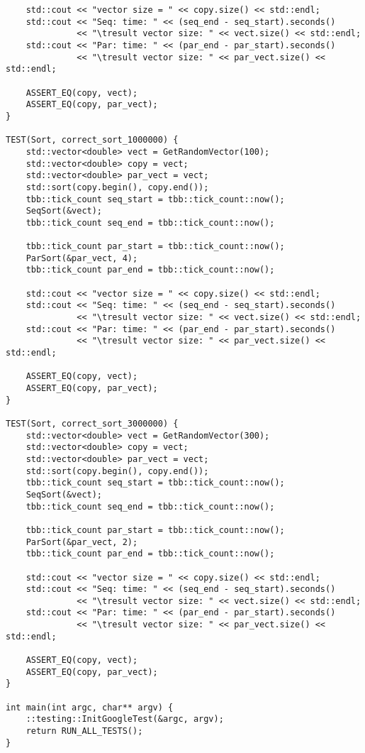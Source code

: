 \documentclass{report}
\begin{document}
\begin{lstlisting}
    std::cout << "vector size = " << copy.size() << std::endl;
    std::cout << "Seq: time: " << (seq_end - seq_start).seconds()
              << "\tresult vector size: " << vect.size() << std::endl;
    std::cout << "Par: time: " << (par_end - par_start).seconds()
              << "\tresult vector size: " << par_vect.size() << std::endl;

    ASSERT_EQ(copy, vect);
    ASSERT_EQ(copy, par_vect);
}

TEST(Sort, correct_sort_1000000) {
    std::vector<double> vect = GetRandomVector(100);
    std::vector<double> copy = vect;
    std::vector<double> par_vect = vect;
    std::sort(copy.begin(), copy.end());
    tbb::tick_count seq_start = tbb::tick_count::now();
    SeqSort(&vect);
    tbb::tick_count seq_end = tbb::tick_count::now();

    tbb::tick_count par_start = tbb::tick_count::now();
    ParSort(&par_vect, 4);
    tbb::tick_count par_end = tbb::tick_count::now();

    std::cout << "vector size = " << copy.size() << std::endl;
    std::cout << "Seq: time: " << (seq_end - seq_start).seconds()
              << "\tresult vector size: " << vect.size() << std::endl;
    std::cout << "Par: time: " << (par_end - par_start).seconds()
              << "\tresult vector size: " << par_vect.size() << std::endl;

    ASSERT_EQ(copy, vect);
    ASSERT_EQ(copy, par_vect);
}

TEST(Sort, correct_sort_3000000) {
    std::vector<double> vect = GetRandomVector(300);
    std::vector<double> copy = vect;
    std::vector<double> par_vect = vect;
    std::sort(copy.begin(), copy.end());
    tbb::tick_count seq_start = tbb::tick_count::now();
    SeqSort(&vect);
    tbb::tick_count seq_end = tbb::tick_count::now();

    tbb::tick_count par_start = tbb::tick_count::now();
    ParSort(&par_vect, 2);
    tbb::tick_count par_end = tbb::tick_count::now();

    std::cout << "vector size = " << copy.size() << std::endl;
    std::cout << "Seq: time: " << (seq_end - seq_start).seconds()
              << "\tresult vector size: " << vect.size() << std::endl;
    std::cout << "Par: time: " << (par_end - par_start).seconds()
              << "\tresult vector size: " << par_vect.size() << std::endl;

    ASSERT_EQ(copy, vect);
    ASSERT_EQ(copy, par_vect);
}

int main(int argc, char** argv) {
    ::testing::InitGoogleTest(&argc, argv);
    return RUN_ALL_TESTS();
}

\end{lstlisting}
\end{document}
